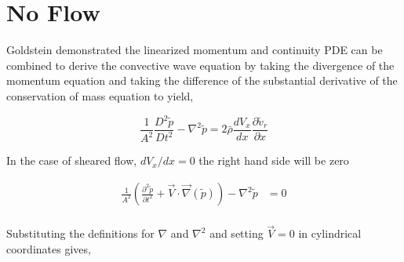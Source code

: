 %
%
%
\section{No Flow}


Goldstein demonstrated the linearized momentum and continuity PDE  can be 
combined to derive the convective wave equation by taking the divergence of
the momentum equation and taking the difference of the substantial derivative
of the conservation of mass equation to yield,

\begin{equation}
    \frac{1}{A^2}\frac{D^2\tilde{p}}{Dt^2} -
    \nabla^2 \tilde{p} =
    2 \bar{\rho} \frac{d V_x}{d x} \frac{\partial  \tilde{v}_r}{ \partial x} 
    \label{eqn:KousensWaveEquation}
\end{equation}


In the case of sheared flow, $dV_x/dx = 0$ the right hand side will be zero 



\begin{align*}
    \frac{1}{A^2}\left(
        \frac{\partial^2 \tilde{p}}{\partial t^2} + 
        \vec{V}\cdot \vec {\nabla} (\tilde{p}) 
    \right) -
    \nabla^2
    \tilde{p} &=
    0 \\
\end{align*}

Substituting the definitions for $\nabla$ and $\nabla^2$ and setting $\vec{V} =0$
in cylindrical coordinates gives,


